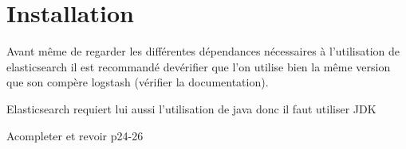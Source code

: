 \section{Installation}
Avant même de regarder les différentes dépendances nécessaires à l'utilisation de
elasticsearch il est recommandé devérifier que l'on utilise bien la même version
que son compère logstash (vérifier la documentation).

Elasticsearch requiert lui aussi l'utilisation de java donc il faut utiliser JDK

Acompleter et revoir
p24-26
